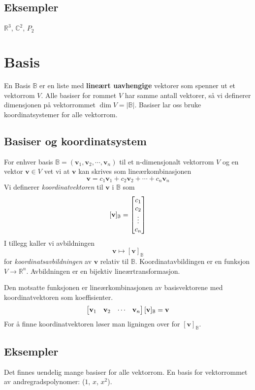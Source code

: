 \documentclass[12pt,a4paper,norsk]{article}
\makeatletter
\newcommand{\R}{\mathbb{R}}
\newcommand{\C}{\mathbb{C}}
\newcommand{\B}{\mathbb{B}}
\newcommand{\mat}[2]{\left[\begin{array}{@{}#1@{}}#2\end{array}\right]}
\newcommand{\vv}{\textbf{v}}
\makeatother
\begin{document}
\subsection{Eksempler}
$\R^{3}$, $\C^{2}$, $P_{2}$

\section{Basis}
En Basis $\B$ er en liste med \textbf{lineært uavhengige} vektorer som spenner ut et
vektorrom $V$. Alle basiser for rommet $V$ har samme antall vektorer, så vi
definerer dimensjonen på vektorrommet $\dim{V} = |\B|$.
Basiser lar oss bruke koordinatsystemer for alle vektorrom.

\subsection{Basiser og koordinatsystem}
For enhver basis $\B=(\vv_1, \vv_2, \cdots, \vv_n)$ til et n-dimensjonalt vektorrom $V$
og en vektor $\vv \in V$ vet vi at $\vv$ kan skrives som lineærkombinasjonen
\[\vv=c_1\vv_1 + c_2\vv_2 + \cdots + c_n\vv_n\]
Vi definerer \textit{koordinatvektoren} til $\vv$ i $\B$ som
\[[\vv]_\B=\mat{c}{c_1\\c_2\\ \vdots \\ c_n}\]
I tillegg kaller vi avbildningen 
\[\vv \mapsto [\vv]_\B\]
for \textit{koordinatsavbildningen} av $\vv$ relativ til $\B$.
Koordinatavbildingen er en funksjon $V \rightarrow \R^n$.
Avbildningen er en bijektiv lineærtransformasjon.

Den motsatte funksjonen er lineærkombinasjonen av basisvektorene
med koordinatvektoren som koeffisienter.
\[\mat{cccc}{\vv_1 & \vv_2 & \cdots & \vv_n}[\vv]_{\B} = \vv\]
For å finne koordinatvektoren løser man ligningen over for $[\vv]_{\B}$.

\subsection{Eksempler}
Det finnes uendelig mange basiser for alle vektorrom.
En basis for vektorrommet av andregradspolynomer: ($1$, $x$, $x^2$).
\end{document}
